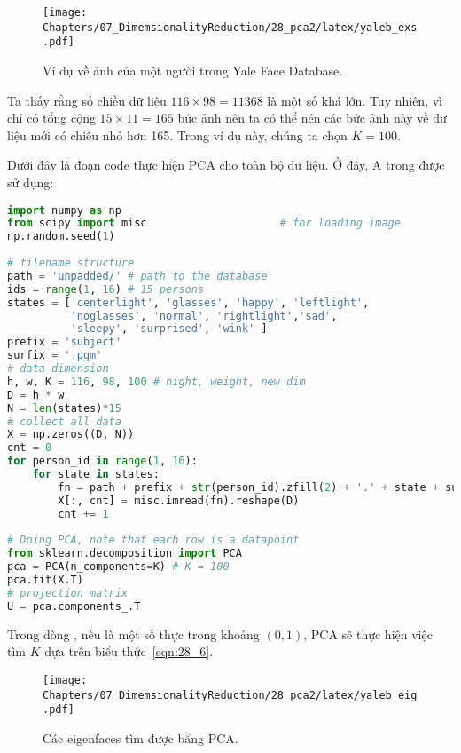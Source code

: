 
\begin{figure}[t]
\centering
    \texttt{[image: Chapters/07\_DimemsionalityReduction/28\_pca2/latex/yaleb\_exs.pdf]}
    \caption[]{Ví dụ về ảnh của một người trong Yale Face Database.}
    \label{fig:28_1}
\end{figure}
Ta thấy rằng số chiều dữ liệu $116 \times 98 = 11368$ là một số khá
lớn. Tuy nhiên, vì chỉ có tổng cộng $15 \times 11 = 165$ bức ảnh nên ta có thể
nén các bức ảnh này về dữ liệu mới có chiều nhỏ hơn 165. Trong ví dụ này, chúng
ta chọn $K = 100$.
 
Dưới đây là đoạn code thực hiện PCA cho toàn bộ dữ liệu. Ở đây, A trong  được sử dụng:
\newpage  
\begin{lstlisting}[language=Python]
import numpy as np 
from scipy import misc                     # for loading image 
np.random.seed(1) 
 
# filename structure 
path = 'unpadded/' # path to the database 
ids = range(1, 16) # 15 persons 
states = ['centerlight', 'glasses', 'happy', 'leftlight', 
          'noglasses', 'normal', 'rightlight','sad', 
          'sleepy', 'surprised', 'wink' ] 
prefix = 'subject' 
surfix = '.pgm' 
# data dimension 
h, w, K = 116, 98, 100 # hight, weight, new dim 
D = h * w 
N = len(states)*15 
# collect all data 
X = np.zeros((D, N)) 
cnt = 0 
for person_id in range(1, 16): 
    for state in states: 
        fn = path + prefix + str(person_id).zfill(2) + '.' + state + surfix 
        X[:, cnt] = misc.imread(fn).reshape(D) 
        cnt += 1 
 
# Doing PCA, note that each row is a datapoint 
from sklearn.decomposition import PCA 
pca = PCA(n_components=K) # K = 100 
pca.fit(X.T) 
# projection matrix 
U = pca.components_.T 
\end{lstlisting}
 
 
Trong dòng , nếu
 là một số thực trong khoảng $(0, 1)$, PCA sẽ thực
hiện việc tìm $K$ dựa trên biểu thức~\eqref{eqn:28_6}. 
 
\begin{figure}[t]
\centering
    \texttt{[image: Chapters/07\_DimemsionalityReduction/28\_pca2/latex/yaleb\_eig.pdf]}
    \caption[]{Các eigenfaces tìm được bằng PCA.}
    \label{fig:28_2}
\end{figure}
 
